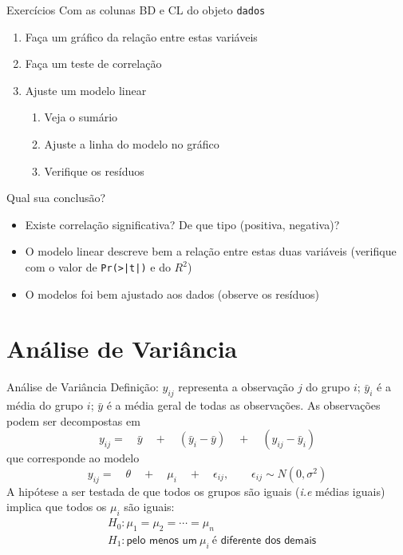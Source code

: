 \documentclass[10pt]{beamer}\usepackage{graphicx, color}
\begin{document}
\begin{frame}[fragile=singleslide]{Exercícios}
Com as colunas BD e CL do objeto \texttt{dados}
\begin{enumerate}
\item Faça um gráfico da relação entre estas variáveis
\item Faça um teste de correlação
\item Ajuste um modelo linear
  \begin{enumerate}
  \item Veja o sumário
  \item Ajuste a linha do modelo no gráfico
  \item Verifique os resíduos
  \end{enumerate}
\end{enumerate}
Qual sua conclusão?
\small
\begin{itemize}
\item Existe correlação significativa? De que tipo (positiva, negativa)?
\item O modelo linear descreve bem a relação entre estas duas variáveis
  (verifique com o valor de \verb+Pr(>|t|)+ e do $R^2$)
\item O modelos foi bem ajustado aos dados (observe os resíduos)
\end{itemize}
\end{frame}


\section[ANOVA]{Análise de Variância}


\begin{frame}[fragile=singleslide]{Análise de Variância}
Definição: $y_{ij}$ representa a observação $j$ do grupo $i$;
$\bar{y}_{i}$ é a média do grupo $i$; $\bar{y}$ é a média geral de todas
as observações. As observações podem ser decompostas em
\begin{equation*}
  y_{ij} = \quad \bar{y} \quad + \quad (\bar{y}_{i} - \bar{y}) \quad + \quad
  (y_{ij} - \bar{y}_{i})
\end{equation*}
que corresponde ao modelo
\begin{equation*}
  y_{ij} = \quad \theta \quad + \quad \mu_i \quad + \quad \epsilon_{ij},
  \qquad \epsilon_{ij} \sim N(0, \sigma^2)
\end{equation*}
A hipótese a ser testada de que todos os grupos são iguais (\textit{i.e}
médias iguais) implica que todos os $\mu_{i}$ são iguais:
\begin{align*}
  &H_0: \mu_1 = \mu_2 = \cdots = \mu_n \\
  &H_1: \textsf{pelo menos um}\ \mu_i\ \textsf{é diferente dos demais}
\end{align*}
\end{frame}
\end{document}

